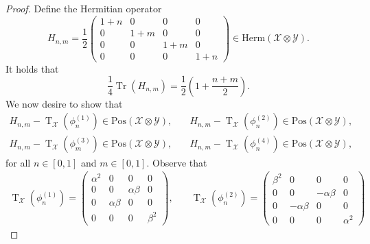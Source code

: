 \documentclass[11pt]{article}
\theoremstyle{definition}
\newcommand{\tr}{\operatorname{Tr}}
\newcommand{\pt}{\operatorname{T}}
\newcommand{\setft}[1]{\mathrm{#1}}
\newcommand{\Pos}{\setft{Pos}}
\newcommand{\Herm}{\setft{Herm}}
\newcommand{\X}{\mathcal{X}}
\newcommand{\Y}{\mathcal{Y}}
\begin{document}
\begin{proof}
	Define the Hermitian operator
	\begin{equation}
        H_{n,m} = \frac{1}{2}
        \begin{pmatrix}
            1+n & 0 & 0 & 0 \\
            0 & 1+m & 0 & 0 \\
            0 & 0 & 1+m & 0 \\
            0 & 0 & 0 & 1+n
        \end{pmatrix}
        \in \Herm(\X \otimes \Y).
	\end{equation}
	It holds that
	\begin{equation}
        \frac{1}{4}\tr(H_{n,m}) = \frac{1}{2} \left(1 + \frac{n+m}{2}\right).
	\end{equation}
    We now desire to show that 
    \begin{equation}
        \begin{aligned}
            H_{n,m} - \pt_{\X}\left(\phi_n^{(1)}\right) \in \Pos(\X \otimes\Y),
            &\quad
            H_{n,m} - \pt_{\X}\left(\phi_n^{(2)}\right) \in \Pos(\X \otimes\Y), \\
            H_{n,m} - \pt_{\X}\left(\phi_m^{(3)}\right) \in \Pos(\X \otimes\Y),
            &\quad
            H_{n,m} - \pt_{\X}\left(\phi_n^{(4)}\right) \in \Pos(\X \otimes\Y),
        \end{aligned}
    \end{equation}
    for all $n \in [0, 1]$ and $m \in [0, 1]$. Observe that
    \begin{equation}\label{eq:partial-transpose-states}
        \begin{aligned}
            \pt_{\X}\left(\phi_n^{(1)}\right) = 
            \begin{pmatrix}
                \alpha^2 & 0 & 0 & 0 \\
                0 & 0 & \alpha\beta & 0 \\
                0 & \alpha\beta & 0 & 0 \\
                0 & 0 & 0 & \beta^2
            \end{pmatrix}, &\quad 
            \pt_{\X}\left(\phi_n^{(2)}\right) = 
            \begin{pmatrix}
                \beta^2 & 0 & 0 & 0 \\
                0 & 0 & -\alpha\beta & 0 \\
                0 & -\alpha\beta & 0 & 0 \\
                0 & 0 & 0 & \alpha^2

\end{pmatrix}
\end{aligned}
\end{equation}
\end{proof}
\end{document}

